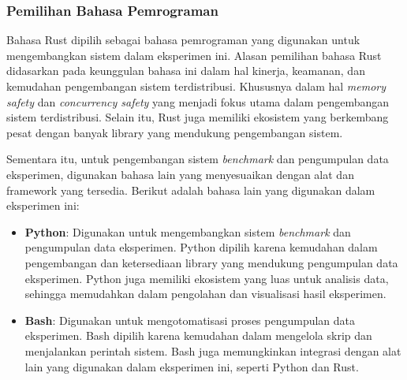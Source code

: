 \subsubsection{Pemilihan Bahasa Pemrograman}
\label{subsubsection:pilihan-bahasa-pemrograman}

Bahasa Rust dipilih sebagai bahasa pemrograman yang digunakan untuk mengembangkan sistem dalam eksperimen ini. Alasan pemilihan bahasa Rust didasarkan pada keunggulan bahasa ini dalam hal kinerja, keamanan, dan kemudahan pengembangan sistem terdistribusi. Khususnya dalam hal \textit{memory safety} dan \textit{concurrency safety} yang menjadi fokus utama dalam pengembangan sistem terdistribusi. Selain itu, Rust juga memiliki ekosistem yang berkembang pesat dengan banyak library yang mendukung pengembangan sistem.

Sementara itu, untuk pengembangan sistem \textit{benchmark} dan pengumpulan data eksperimen, digunakan bahasa lain yang menyesuaikan dengan alat dan framework yang tersedia. Berikut adalah bahasa lain yang digunakan dalam eksperimen ini:
\begin{itemize}
    \item \textbf{Python}: Digunakan untuk mengembangkan sistem \textit{benchmark} dan pengumpulan data eksperimen. Python dipilih karena kemudahan dalam pengembangan dan ketersediaan library yang mendukung pengumpulan data eksperimen. Python juga memiliki ekosistem yang luas untuk analisis data, sehingga memudahkan dalam pengolahan dan visualisasi hasil eksperimen.
    \item \textbf{Bash}: Digunakan untuk mengotomatisasi proses pengumpulan data eksperimen. Bash dipilih karena kemudahan dalam mengelola skrip dan menjalankan perintah sistem. Bash juga memungkinkan integrasi dengan alat lain yang digunakan dalam eksperimen ini, seperti Python dan Rust.
\end{itemize}